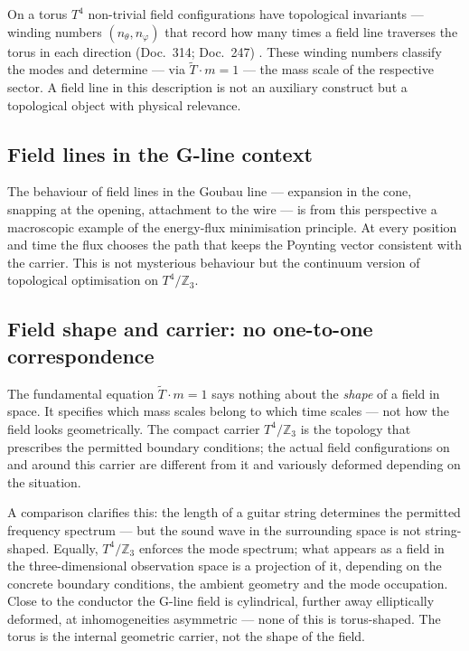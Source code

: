 On a torus $T^4$ non-trivial field configurations have topological
invariants --- winding numbers $(n_\theta, n_\varphi)$ that record how many
times a field line traverses the torus in each direction (Doc.~314;
Doc.~247) \BM. These winding numbers classify the modes and determine ---
via $\tilde{T}\cdot m=1$ --- the mass scale of the respective sector. A
field line in this description is not an auxiliary construct but a
topological object with physical relevance.

\subsection*{Field lines in the G-line context}

The behaviour of field lines in the Goubau line --- expansion in the cone,
snapping at the opening, attachment to the wire --- is from this perspective
a macroscopic example of the energy-flux minimisation principle. At every
position and time the flux chooses the path that keeps the Poynting vector
consistent with the carrier. This is not mysterious behaviour but the
continuum version of topological optimisation on $T^4/\mathbb{Z}_3$.

\subsection*{Field shape and carrier: no one-to-one correspondence}

The fundamental equation $\tilde{T}\cdot m=1$ says nothing about the
\emph{shape} of a field in space. It specifies which mass scales belong
to which time scales --- not how the field looks geometrically. The compact
carrier $T^4/\mathbb{Z}_3$ is the topology that prescribes the permitted
boundary conditions; the actual field configurations on and around this
carrier are different from it and variously deformed depending on the
situation.

A comparison clarifies this: the length of a guitar string determines the
permitted frequency spectrum --- but the sound wave in the surrounding
space is not string-shaped. Equally, $T^4/\mathbb{Z}_3$ enforces the mode
spectrum; what appears as a field in the three-dimensional observation space
is a projection of it, depending on the concrete boundary conditions,
the ambient geometry and the mode occupation. Close to the conductor the
G-line field is cylindrical, further away elliptically deformed, at
inhomogeneities asymmetric --- none of this is torus-shaped. The torus is
the internal geometric carrier, not the shape of the field.

